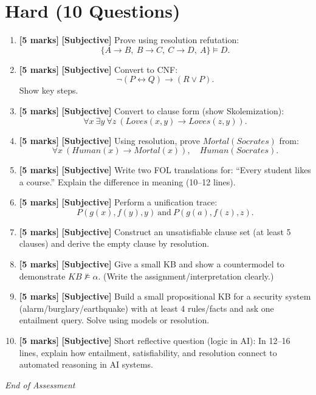\documentclass[11pt,a4paper]{article}
\newcommand{\HMarks}{\textbf{[5 marks]} }
\begin{document}
\section*{Hard (10 Questions)}
\begin{enumerate}[label=\textbf{H\arabic*.}, leftmargin=*]
  \item \HMarks \textbf{[Subjective]} Prove using resolution refutation:
    \[
      \{A \rightarrow B,\ B \rightarrow C,\ C \rightarrow D,\ A\} \models D.
    \]

  \item \HMarks \textbf{[Subjective]} Convert to CNF:
    \[
      \lnot(P \leftrightarrow Q) \rightarrow (R \lor P).
    \]
    Show key steps.

  \item \HMarks \textbf{[Subjective]} Convert to clause form (show Skolemization):
    \[
      \forall x\ \exists y\ \forall z\ (Loves(x,y) \rightarrow Loves(z,y)).
    \]

  \item \HMarks \textbf{[Subjective]} Using resolution, prove $Mortal(Socrates)$ from:
    \[
      \forall x\ (Human(x) \rightarrow Mortal(x)),\quad Human(Socrates).
    \]

  \item \HMarks \textbf{[Subjective]} Write two FOL translations for:
    ``Every student likes a course.''
    Explain the difference in meaning (10--12 lines).

  \item \HMarks \textbf{[Subjective]} Perform a unification trace:
    \[
      P(g(x), f(y), y)\ \text{and}\ P(g(a), f(z), z).
    \]

  \item \HMarks \textbf{[Subjective]} Construct an unsatisfiable clause set (at least 5 clauses) and derive the empty clause by resolution.

  \item \HMarks \textbf{[Subjective]} Give a small KB and show a countermodel to demonstrate $KB \not\models \alpha$.
    (Write the assignment/interpretation clearly.)

  \item \HMarks \textbf{[Subjective]} Build a small propositional KB for a security system (alarm/burglary/earthquake)
    with at least 4 rules/facts and ask one entailment query. Solve using models or resolution.

  \item \HMarks \textbf{[Subjective]} Short reflective question (logic in AI):
    In 12--16 lines, explain how entailment, satisfiability, and resolution connect to automated reasoning in AI systems.
\end{enumerate}

\vfill
\noindent\textit{End of Assessment}
\end{document}
